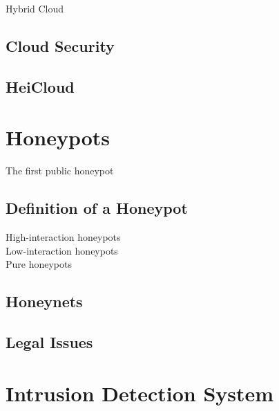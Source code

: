 Hybrid Cloud\\

\subsection{Cloud Security}

\cite{Nithin2012}

\subsection{HeiCloud}

\section{Honeypots}

The first public honeypot \cite{Spitzner2003}

\subsection{Definition of a Honeypot}

\cite{Spitzner2003}

High-interaction honeypots\\

Low-interaction honeypots\\

Pure honeypots\\



\subsection{Honeynets}

\cite{Spitzner2003}

\subsection{Legal Issues}

\cite{Spitzner2003}

\section{Intrusion Detection System}
